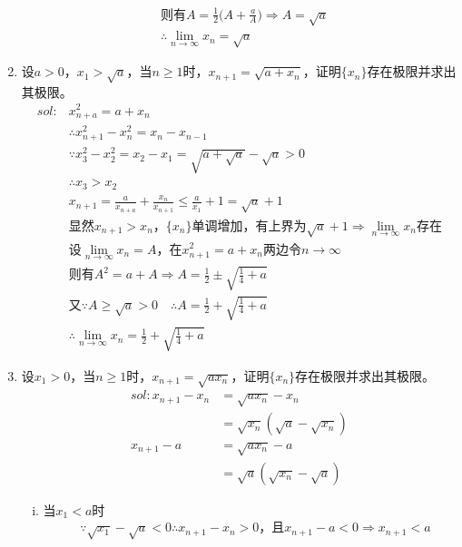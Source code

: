 \begin{enumerate}[{例}1.]
\begin{align*}
                &\mbox{则有}A=\frac{1}{2}\Big(A+\frac{a}{A}\Big)\Rightarrow A=\sqrt{a}\\
                &\therefore \lim_{n \to \infty}x_n=\sqrt{a}
        \end{align*}
    \item 设$a>0$，$x_1>\sqrt{a}$，当$n\geq1$时，$x_{n+1}=\sqrt{a+x_n}$，证明$\{x_n\}$存在极限并求出其极限。
        \begin{align*}
            sol:&x_{n+a}^2=a+x_n\\
                &\therefore x_{n+1}^2-x_n^2=x_n-x_{n-1}\\
                &\because x_3^2-x_2^2=x_2-x_1=\sqrt{a+\sqrt{a}}-\sqrt{a}>0\\
                &\therefore x_3>x_2\\
                &x_{n+1}=\frac{a}{x_{n+a}}+\frac{x_n}{x_{n+1}}\leq \frac{a}{x_1}+1=\sqrt{a}+1\\
                &\mbox{显然}x_{n+1}>x_n\mbox{，}\{x_n\}\mbox{单调增加，有上界为}\sqrt{a}+1\Rightarrow\lim_{n \to \infty}x_n\mbox{存在}\\
                &\mbox{设}\lim_{n \to \infty}x_n=A\mbox{，在}x_{n+1}^2=a+x_n\mbox{两边令}n\to \infty\\
                &\mbox{则有}A^2=a+A\Rightarrow A=\frac{1}{2}\pm\sqrt{\frac{1}{4}+a}\\
                &\mbox{又}\because A\geq \sqrt{a}>0\quad\therefore A=\frac{1}{2}+\sqrt{\frac{1}{4}+a}\\
                &\therefore \lim_{n \to \infty}x_n=\frac{1}{2}+\sqrt{\frac{1}{4}+a}
        \end{align*}
    \item 设$x_1>0$，当$n\geq1$时，$x_{n+1}=\sqrt{a x_n}$，证明$\{x_n\}$存在极限并求出其极限。
        \begin{align*}
            sol:x_{n+1}-x_n&=\sqrt{ax_n}-x_n\\
                &=\sqrt{x_n}(\sqrt{a}-\sqrt{x_n})\\
                x_{n+1}-a&=\sqrt{ax_n}-a\\
                &=\sqrt{a}(\sqrt{x_n}-\sqrt{a})
        \end{align*}
        \begin{enumerate}[(i)]
            \item 当$x_1<a$时
                \begin{align*}
                    &\because\sqrt{x_1}-\sqrt{a}<0\therefore x_{n+1}-x_n>0\mbox{，且}x_{n+1}-a<0\Rightarrow x_{n+1}<a\\

\end{align*}
\end{enumerate}
\end{enumerate}
